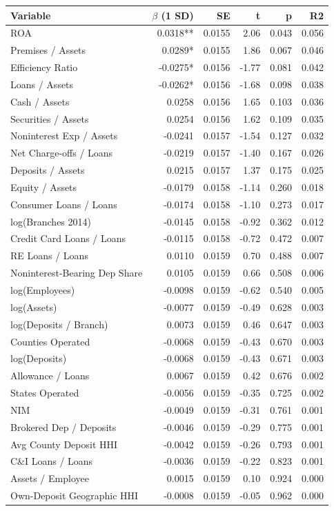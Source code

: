 
\begin{tabular}{lrrrrr}
\toprule
Variable & $\beta$ (1 SD) & SE & t & p & R2\\
\midrule
ROA & 0.0318** & 0.0155 & 2.06 & 0.043 & 0.056\\
Premises / Assets & 0.0289* & 0.0155 & 1.86 & 0.067 & 0.046\\
Efficiency Ratio & -0.0275* & 0.0156 & -1.77 & 0.081 & 0.042\\
Loans / Assets & -0.0262* & 0.0156 & -1.68 & 0.098 & 0.038\\
Cash / Assets & 0.0258 & 0.0156 & 1.65 & 0.103 & 0.036\\
Securities / Assets & 0.0254 & 0.0156 & 1.62 & 0.109 & 0.035\\
Noninterest Exp / Assets & -0.0241 & 0.0157 & -1.54 & 0.127 & 0.032\\
Net Charge-offs / Loans & -0.0219 & 0.0157 & -1.40 & 0.167 & 0.026\\
Deposits / Assets & 0.0215 & 0.0157 & 1.37 & 0.175 & 0.025\\
Equity / Assets & -0.0179 & 0.0158 & -1.14 & 0.260 & 0.018\\
Consumer Loans / Loans & -0.0174 & 0.0158 & -1.10 & 0.273 & 0.017\\
log(Branches 2014) & -0.0145 & 0.0158 & -0.92 & 0.362 & 0.012\\
Credit Card Loans / Loans & -0.0115 & 0.0158 & -0.72 & 0.472 & 0.007\\
RE Loans / Loans & 0.0110 & 0.0159 & 0.70 & 0.488 & 0.007\\
Noninterest-Bearing Dep Share & 0.0105 & 0.0159 & 0.66 & 0.508 & 0.006\\
log(Employees) & -0.0098 & 0.0159 & -0.62 & 0.540 & 0.005\\
log(Assets) & -0.0077 & 0.0159 & -0.49 & 0.628 & 0.003\\
log(Deposits / Branch) & 0.0073 & 0.0159 & 0.46 & 0.647 & 0.003\\
Counties Operated & -0.0068 & 0.0159 & -0.43 & 0.670 & 0.003\\
log(Deposits) & -0.0068 & 0.0159 & -0.43 & 0.671 & 0.003\\
Allowance / Loans & 0.0067 & 0.0159 & 0.42 & 0.676 & 0.002\\
States Operated & -0.0056 & 0.0159 & -0.35 & 0.725 & 0.002\\
NIM & -0.0049 & 0.0159 & -0.31 & 0.761 & 0.001\\
Brokered Dep / Deposits & -0.0046 & 0.0159 & -0.29 & 0.775 & 0.001\\
Avg County Deposit HHI & -0.0042 & 0.0159 & -0.26 & 0.793 & 0.001\\
C\&I Loans / Loans & -0.0036 & 0.0159 & -0.22 & 0.823 & 0.001\\
Assets / Employee & 0.0015 & 0.0159 & 0.10 & 0.924 & 0.000\\
Own-Deposit Geographic HHI & -0.0008 & 0.0159 & -0.05 & 0.962 & 0.000\\
\bottomrule
\end{tabular}
